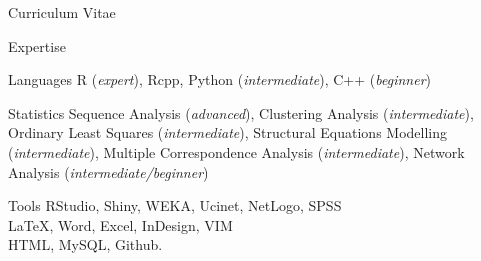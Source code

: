 \documentclass[12pt,a4paper]{article}
\newcommand*{\ac}[1]{\mbox{#1}}
\begin{document}
\begin{cv}{Curriculum Vitae}
\begin{cvlist}{\ac{Expertise}}
	\item[Languages] R (\emph{expert}), Rcpp, Python (\emph{intermediate}),  C++ (\emph{beginner}) 
	
	\item[Statistics] Sequence Analysis (\emph{advanced}), 
	Clustering Analysis (\emph{intermediate}), 
	Ordinary Least Squares (\emph{intermediate}), Structural Equations Modelling (\emph{intermediate}), Multiple Correspondence Analysis (\emph{intermediate}), 
	Network Analysis (\emph{intermediate/beginner})
	
	\item[Tools] RStudio, Shiny, \ac{WEKA}, Ucinet, NetLogo, \ac{SPSS} \\ \LaTeX, Word, Excel, InDesign, \ac{VIM} \\ 
	\ac{HTML}, MySQL, Github.
\end{cvlist}

  \date{~March~2020}
\end{cv}
\end{document}
